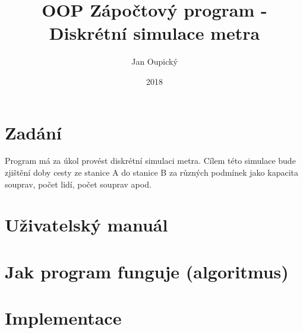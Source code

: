 \documentclass[12pt, a4paper]{article}
\title{OOP Zápočtový program - Diskrétní simulace metra}
\author{Jan Oupický}
\date{2018}
\begin{document}
\maketitle

\section{Zadání}

Program má za úkol provést diskrétní simulaci metra. Cílem této simulace bude zjištění doby cesty ze stanice A do stanice B za různých podmínek jako kapacita souprav, počet lidí, počet souprav apod. 

\section{Uživatelský manuál}



\section{Jak program funguje (algoritmus)}

\section{Implementace}
\end{document}
